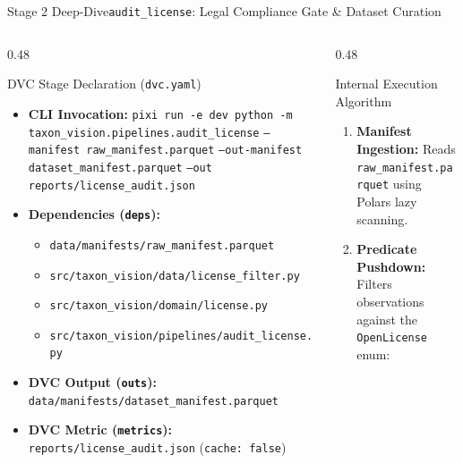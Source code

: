 \begin{frame}{Stage 2 Deep-Dive}{\texttt{audit\_license}: Legal Compliance Gate \& Dataset Curation}
\begin{columns}[T]
\begin{column}{0.48\textwidth}
            \begin{block}{DVC Stage Declaration (\texttt{dvc.yaml})}
                \begin{itemize}\scriptsize
                    \item \textbf{CLI Invocation:}
                        \texttt{pixi run -e dev python -m} \newline
                        \texttt{taxon\_vision.pipelines.audit\_license} \newline
                        \texttt{--manifest raw\_manifest.parquet} \newline
                        \texttt{--out-manifest dataset\_manifest.parquet} \newline
                        \texttt{--out reports/license\_audit.json}
                    \item \textbf{Dependencies (\texttt{deps}):}
                        \begin{itemize}\tiny
                            \item \texttt{data/manifests/raw\_manifest.parquet}
                            \item \texttt{src/taxon\_vision/data/license\_filter.py}
                            \item \texttt{src/taxon\_vision/domain/license.py}
                            \item \texttt{src/taxon\_vision/pipelines/audit\_license.py}
                        \end{itemize}
                    \item \textbf{DVC Output (\texttt{outs}):}
                        \texttt{data/manifests/dataset\_manifest.parquet}
                    \item \textbf{DVC Metric (\texttt{metrics}):}
                        \texttt{reports/license\_audit.json} (\texttt{cache: false})
                \end{itemize}
            \end{block}
        \end{column}
        \begin{column}{0.48\textwidth}
            \begin{block}{Internal Execution Algorithm}
                \begin{enumerate}\scriptsize
                    \item \textbf{Manifest Ingestion:} Reads \texttt{raw\_manifest.parquet} using Polars lazy scanning.
                    \item \textbf{Predicate Pushdown:} Filters observations against the \texttt{OpenLicense} enum:

\end{enumerate}
\end{block}
\end{column}
\end{columns}
\end{frame}
